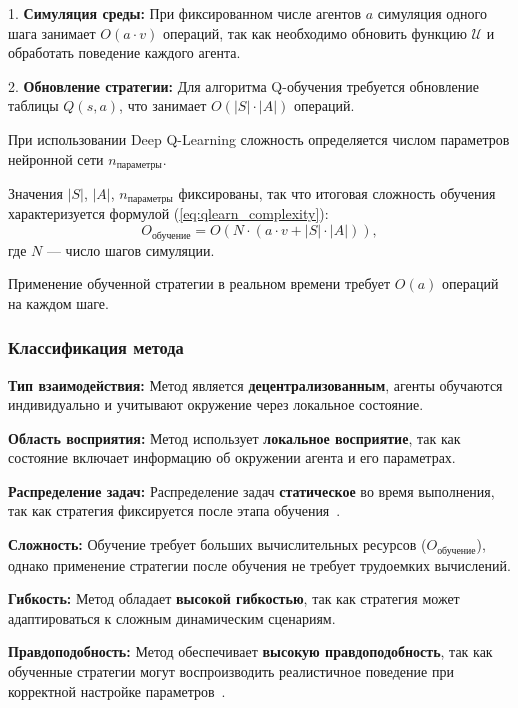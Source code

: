 1. \textbf{Симуляция среды:} При фиксированном числе агентов $a$ симуляция одного шага занимает $O(a \cdot v)$ операций, так как необходимо обновить функцию $\mathcal{U}$ и обработать поведение каждого агента.

2. \textbf{Обновление стратегии:} Для алгоритма Q-обучения требуется обновление таблицы $Q(s, a)$, что занимает $O(|S| \cdot |A|)$ операций.

При использовании Deep Q-Learning сложность определяется числом параметров нейронной сети $n_{\text{параметры}}$.

Значения $|S|$, $|A|$, $n_{\text{параметры}}$ фиксированы, так что итоговая сложность обучения характеризуется формулой (\ref{eq:qlearn_complexity}):
\begin{equation}
	\label{eq:qlearn_complexity}
	O_{\text{обучение}} = O(N \cdot (a \cdot v + |S| \cdot |A|)),
\end{equation}
где $N$ — число шагов симуляции.

Применение обученной стратегии в реальном времени требует $O(a)$ операций на каждом шаге.

\subsubsection*{Классификация метода}
\textbf{Тип взаимодействия:}  
Метод является \textbf{децентрализованным}, агенты обучаются индивидуально и учитывают окружение через локальное состояние. 

\textbf{Область восприятия:}  
Метод использует \textbf{локальное восприятие}, так как состояние включает информацию об окружении агента и его параметрах.

\textbf{Распределение задач:}  
Распределение задач \textbf{статическое} во время выполнения, так как стратегия фиксируется после этапа обучения~\cite{markov-decision-process}.  

\textbf{Сложность:}  
Обучение требует больших вычислительных ресурсов ($O_{\text{обучение}}$), однако применение стратегии после обучения не требует трудоемких вычислений.

\textbf{Гибкость:}  
Метод обладает \textbf{высокой гибкостью}, так как стратегия может адаптироваться к сложным динамическим сценариям.  

\textbf{Правдоподобность:}  
Метод обеспечивает \textbf{высокую правдоподобность}, так как обученные стратегии могут воспроизводить реалистичное поведение при корректной настройке параметров~\cite{hysteretic-q-learning}.

